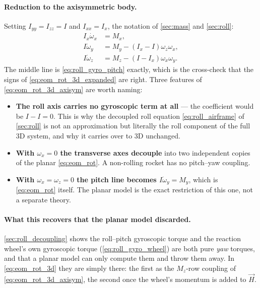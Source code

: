 \paragraph{Reduction to the axisymmetric body.} Setting $I_{yy}=I_{zz}=I$ and $I_{xx}=I_x$, the
notation of \autoref{sec:mass} and \autoref{sec:roll}:
\begin{equation} \label{eq:eom_rot_3d_axisym}
    \begin{aligned}
        I_x\dot\omega_x &= M_x, \\
        I\dot\omega_y &= M_y - \left(I_x-I\right)\omega_z\omega_x, \\
        I\dot\omega_z &= M_z - \left(I-I_x\right)\omega_x\omega_y.
    \end{aligned}
\end{equation}
The middle line is \autoref{eq:roll_gyro_pitch} exactly, which is the cross-check that the signs of
\autoref{eq:eom_rot_3d_expanded} are right. Three features of
\autoref{eq:eom_rot_3d_axisym} are worth naming:
\begin{itemize}
    \item \textbf{The roll axis carries no gyroscopic term at all} --- the coefficient would be
    $I-I=0$. This is why the decoupled roll equation \autoref{eq:roll_airframe} of
    \autoref{sec:roll} is not an approximation but literally the roll component of the full 3D
    system, and why it carries over to 3D unchanged.
    \item \textbf{With $\omega_x=0$ the transverse axes decouple} into two independent copies of
    the planar \autoref{eq:eom_rot}. A non-rolling rocket has no pitch--yaw coupling.
    \item \textbf{With $\omega_x=\omega_z=0$ the pitch line becomes $I\dot\omega_y=M_y$}, which is
    \autoref{eq:eom_rot} itself. The planar model is the exact restriction of this one, not a
    separate theory.
\end{itemize}

\paragraph{What this recovers that the planar model discarded.} \autoref{sec:roll_decoupling}
shows the roll--pitch gyroscopic torque and the reaction wheel's own gyroscopic torque
(\autoref{eq:roll_gyro_wheel}) are both pure \emph{yaw} torques, and that a planar model can only
compute them and throw them away. In \autoref{eq:eom_rot_3d} they are simply there: the first as
the $M_z$-row coupling of \autoref{eq:eom_rot_3d_axisym}, the second once the wheel's momentum is
added to $\vec{H}$.

